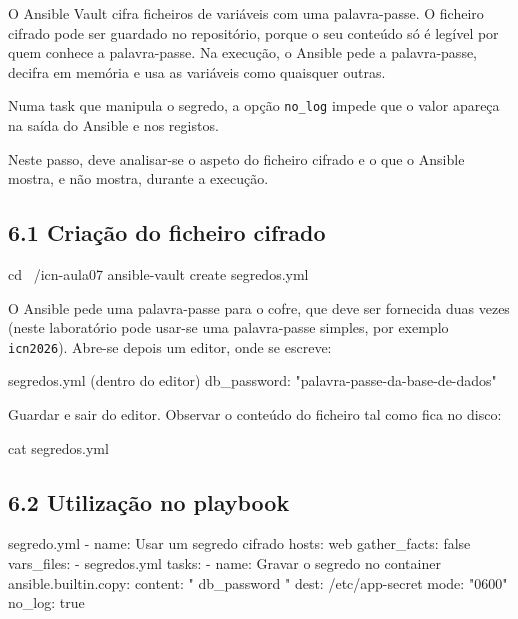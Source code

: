\documentclass[11pt,a4paper]{article}
\newcommand{\cmd}[1]{\texttt{#1}}
\begin{document}
\begin{teoria}
O Ansible Vault cifra ficheiros de variáveis com uma palavra-passe. O ficheiro cifrado pode ser guardado no repositório, porque o seu conteúdo só é legível por quem conhece a palavra-passe. Na execução, o Ansible pede a palavra-passe, decifra em memória e usa as variáveis como quaisquer outras.

Numa task que manipula o segredo, a opção \cmd{no\_log} impede que o valor apareça na saída do Ansible e nos registos.

Neste passo, deve analisar-se o aspeto do ficheiro cifrado e o que o Ansible mostra, e não mostra, durante a execução.
\end{teoria}

\subsection*{6.1 Criação do ficheiro cifrado}

\begin{terminal}
cd ~/icn-aula07
ansible-vault create segredos.yml
\end{terminal}

O Ansible pede uma palavra-passe para o cofre, que deve ser fornecida duas vezes (neste laboratório pode usar-se uma palavra-passe simples, por exemplo \cmd{icn2026}). Abre-se depois um editor, onde se escreve:

\begin{ficheiro}{segredos.yml (dentro do editor)}
db_password: "palavra-passe-da-base-de-dados"
\end{ficheiro}

Guardar e sair do editor. Observar o conteúdo do ficheiro tal como fica no disco:

\begin{terminal}
cat segredos.yml
\end{terminal}


\subsection*{6.2 Utilização no playbook}

\begin{ficheiro}{segredo.yml}
- name: Usar um segredo cifrado
  hosts: web
  gather_facts: false
  vars_files:
    - segredos.yml
  tasks:
    - name: Gravar o segredo no container
      ansible.builtin.copy:
        content: "{{ db_password }}"
        dest: /etc/app-secret
        mode: "0600"
      no_log: true
\end{ficheiro}
\end{document}

